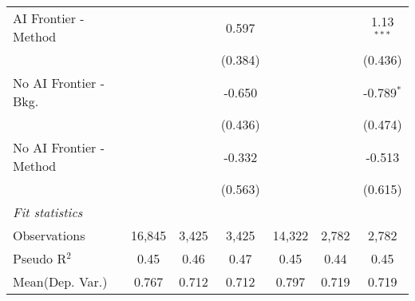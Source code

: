 \begin{tabular}{lcccccc}
   AI Frontier - Method    &               &              & 0.597        &               &              & 1.13$^{***}$\\   
                           &               &              & (0.384)      &               &              & (0.436)\\   
   No AI Frontier - Bkg.   &               &              & -0.650       &               &              & -0.789$^{*}$\\   
                           &               &              & (0.436)      &               &              & (0.474)\\   
   No AI Frontier - Method &               &              & -0.332       &               &              & -0.513\\   
                           &               &              & (0.563)      &               &              & (0.615)\\   
   \midrule
   \emph{Fit statistics}\\
   Observations            & 16,845        & 3,425        & 3,425        & 14,322        & 2,782        & 2,782\\  
   Pseudo R$^2$            & 0.45          & 0.46         & 0.47         & 0.45          & 0.44         & 0.45\\  
Mean(Dep. Var.) & 0.767 & 0.712 & 0.712 & 0.797 & 0.719 & 0.719 \\
   

\end{tabular}
